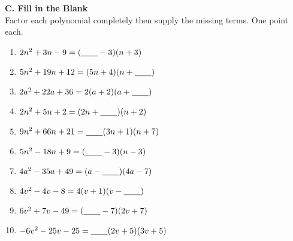     \vspace*{1.3ex}
    
    \noindent \textbf{C. Fill in the Blank} \\
    
    Factor each polynomial completely then supply the missing terms. One point each.
    
    \begin{enumerate}
    		\item $ 2n^2 + 3n - 9 = (\underline{\hspace{2em}} - 3)(n + 3) $
    		\item $ 5n^2 + 19n + 12 = (5n + 4)(n + \underline{\hspace{2em}}) $
    		\item $ 2a^2 + 22a + 36 = 2(a + 2)(a + \underline{\hspace{2em}}) $
    		\item $ 2n^2 + 5n + 2 = (2n + \underline{\hspace{2em}})(n + 2) $
    		\item $ 9n^2 + 66n + 21 = \underline{\hspace{2em}}(3n + 1) (n + 7) $
    		\item $ 5n^2 - 18n + 9 = (\underline{\hspace{2em}} - 3)(n - 3) $
    		\item $ 4a^2 - 35a + 49 = (a - \underline{\hspace{2em}}) (4a - 7) $
    		\item $ 4v^2 - 4v - 8 = 4(v + 1) (v - \underline{\hspace{2em}}) $
    		\item $ 6v^2 + 7v - 49 = (\underline{\hspace{2em}} - 7) (2v + 7) $
    		\item $ -6v^2 - 25v - 25 = \underline{\hspace{2em}}(2v + 5)(3v + 5) $
    \end{enumerate}

    \newpage
    
